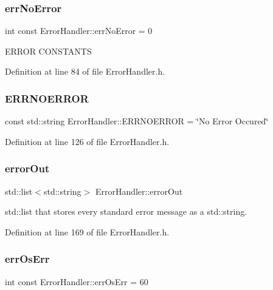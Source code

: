 \subsubsection{\texorpdfstring{errNoError}{errNoError}}
{\footnotesize\ttfamily int const Error\+Handler\+::err\+No\+Error = 0\hspace{0.3cm}{\ttfamily [static]}}

E\+R\+R\+OR C\+O\+N\+S\+T\+A\+N\+TS 

Definition at line 84 of file Error\+Handler.\+h.

\mbox{\label{classErrorHandler_ae805d5476c00a9687c15183268d4e2dd}} 
\subsubsection{\texorpdfstring{ERRNOERROR}{ERRNOERROR}}
{\footnotesize\ttfamily const std\+::string Error\+Handler\+::\+E\+R\+R\+N\+O\+E\+R\+R\+OR = \char`\"{}No Error Occured\char`\"{}\hspace{0.3cm}{\ttfamily [static]}}



Definition at line 126 of file Error\+Handler.\+h.

\mbox{\label{classErrorHandler_aeb3bff116fcb83a58defbef8e8111f0e}} 
\subsubsection{\texorpdfstring{errorOut}{errorOut}}
{\footnotesize\ttfamily std\+::list$<$std\+::string$>$ Error\+Handler\+::error\+Out\hspace{0.3cm}{\ttfamily [private]}}

std\+::list that stores every standard error message as a std\+::string. 

Definition at line 169 of file Error\+Handler.\+h.

\mbox{\label{classErrorHandler_ab216b4dc48424850bdf52da2f4273023}} 
\subsubsection{\texorpdfstring{errOsErr}{errOsErr}}
{\footnotesize\ttfamily int const Error\+Handler\+::err\+Os\+Err = 60\hspace{0.3cm}{\ttfamily [static]}}



